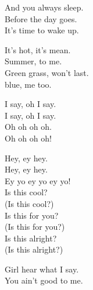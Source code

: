 And you always sleep. \\
Before the day goes. \\
It's time to wake up. \\




It's hot, it's mean. \\
Summer, to me. \\
Green grass, won't last. \\
 blue, me too. \\




I say, oh I say. \\
I say, oh I say. \\
Oh oh oh oh. \\
Oh oh oh oh! \\




Hey, ey hey. \\
Hey, ey hey. \\
Ey yo ey yo ey yo! \\

Is this cool? \\
(Is this cool?) \\
Is this for you? \\
(Is this for you?) \\
Is this alright? \\
(Is this alright?) \\




Girl hear what I say. \\
You ain't good to me. \\

